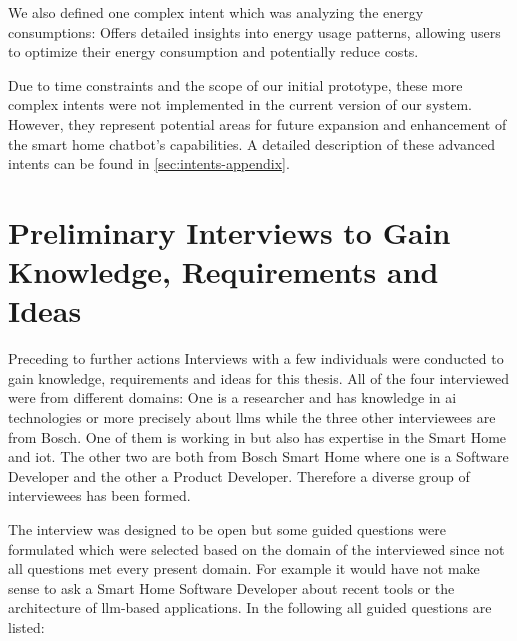 We also defined one complex intent which was analyzing the energy consumptions: Offers detailed insights into energy usage patterns, allowing users to optimize their energy consumption and potentially reduce costs.

Due to time constraints and the scope of our initial prototype, these more complex intents were not implemented in the current version of our system. 
However, they represent potential areas for future expansion and enhancement of the smart home chatbot's capabilities. A detailed description of these advanced intents can be found in \cref{sec:intents-appendix}.

\section{Preliminary Interviews to Gain Knowledge, Requirements and Ideas}
Preceding to further actions Interviews with a few individuals were conducted to gain knowledge, requirements and ideas for this thesis.
All of the four interviewed were from different domains: One is a researcher and has knowledge in \gls{ai} technologies or more precisely about \glspl{llm} while the three other interviewees are from Bosch.
One of them is working in  but also has expertise in the Smart Home and \gls{iot}. 
The other two are both from Bosch Smart Home where one is a Software Developer and the other a Product Developer.
Therefore a diverse group of interviewees has been formed.

The interview was designed to be open but some guided questions were formulated which were selected based on the domain of the interviewed since not all questions met every present domain.
For example it would have not make sense to ask a Smart Home Software Developer about recent tools or the architecture of \gls{llm}-based applications.
In the following all guided questions are listed:

